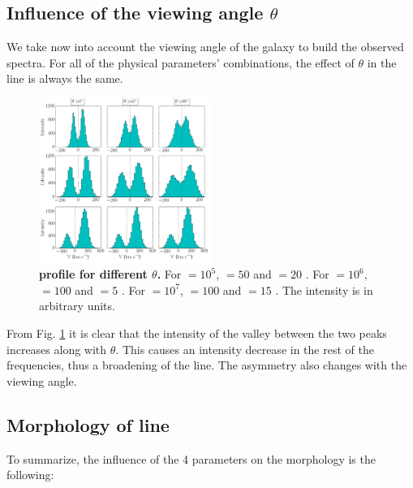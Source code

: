 \documentclass[twocolappendix]{latex/emulateapj}
\begin{document}
\subsection{Influence of the viewing angle $\theta$}
We take now into account the viewing angle of the galaxy to build the observed spectra. For all of the physical parameters' combinations, the effect of $\theta$ in the \lya line is always the same.\\

\begin{figure}[h!]
	\begin{center}
		\includegraphics[width=0.5\textwidth]{./figures/angles}
	\end{center}
	\caption{\textbf{\lya profile for different $\theta$.} For \tauh$=10^5$, \vrot$=50$ \kms and \vout$=20$ \kms. For \tauh$=10^6$, \vrot$=100$ \kms and \vout$=5$ \kms. For \tauh$=10^7$, \vrot$=100$ \kms and \vout$=15$ \kms. The intensity is in arbitrary units.
		\label{fig:angles}}
\end{figure}

From Fig. \ref{fig:angles} it is clear that the intensity of the valley between the two peaks increases along with $\theta$. This causes an intensity decrease in the rest of the frequencies, thus a broadening of the line. The asymmetry also changes with the viewing angle.\\


\subsection{Morphology of \lya line}

To summarize, the influence of the 4 parameters on the \lya morphology is the following: 
\end{document}
